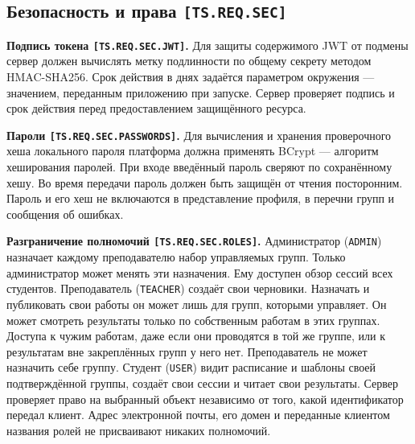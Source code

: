 \documentclass[12pt,a4paper]{article}
\begin{document}
\subsection{\texorpdfstring{Безопасность и права \texttt{[TS.\allowbreak{}REQ.\allowbreak{}SEC]}}{Безопасность и права }}\label{34-ux431ux435ux437ux43eux43fux430ux441ux43dux43eux441ux442ux44c-ux438-ux43fux440ux430ux432ux430-tsreqsec}

\hypertarget{34-безопасность-и-права-tsreqsec}{}

\hypertarget{ts-req-sec}{}

\hypertarget{ts-req-sec-jwt}{} \textbf{Подпись токена \texttt{[TS.\allowbreak{}REQ.\allowbreak{}SEC.\allowbreak{}JWT]}.} Для защиты содержимого JWT от подмены сервер должен вычислять метку подлинности по общему секрету методом HMAC-SHA256. Срок действия в днях задаётся параметром окружения --- значением, переданным приложению при запуске. Сервер проверяет подпись и срок действия перед предоставлением защищённого ресурса.

\hypertarget{ts-req-sec-passwords}{} \textbf{Пароли \texttt{[TS.\allowbreak{}REQ.\allowbreak{}SEC.\allowbreak{}PASSWORDS]}.} Для вычисления и хранения проверочного хеша локального пароля платформа должна применять BCrypt --- алгоритм хеширования паролей. При входе введённый пароль сверяют по сохранённому хешу. Во время передачи пароль должен быть защищён от чтения посторонним. Пароль и его хеш не включаются в представление профиля, в перечни групп и сообщения об ошибках.

\hypertarget{ts-req-sec-roles}{} \textbf{Разграничение полномочий \texttt{[TS.\allowbreak{}REQ.\allowbreak{}SEC.\allowbreak{}ROLES]}.} Администратор (\texttt{ADMIN}) назначает каждому преподавателю набор управляемых групп. Только администратор может менять эти назначения. Ему доступен обзор сессий всех студентов. Преподаватель (\texttt{TEACHER}) создаёт свои черновики. Назначать и публиковать свои работы он может лишь для групп, которыми управляет. Он может смотреть результаты только по собственным работам в этих группах. Доступа к чужим работам, даже если они проводятся в той же группе, или к результатам вне закреплённых групп у него нет. Преподаватель не может назначить себе группу. Студент (\texttt{USER}) видит расписание и шаблоны своей подтверждённой группы, создаёт свои сессии и читает свои результаты. Сервер проверяет право на выбранный объект независимо от того, какой идентификатор передал клиент. Адрес электронной почты, его домен и переданные клиентом названия ролей не присваивают никаких полномочий.
\end{document}
